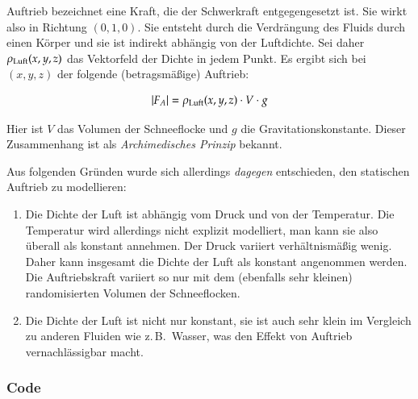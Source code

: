 Auftrieb bezeichnet eine Kraft, die der Schwerkraft entgegengesetzt
ist. Sie wirkt also in Richtung $(0,1,0)$. Sie entsteht durch die
Verdrängung des Fluids durch einen Körper und sie ist indirekt
abhängig von der Luftdichte. Sei daher
$\rho_{\textnormal{Luft}}(x,y,z)$ das Vektorfeld der Dichte in
jedem Punkt. Es ergibt sich bei $(x,y,z)$ der folgende (betragsmäßige)
Auftrieb:

\begin{equation}
|F_A| = \rho_{\textnormal{Luft}}(x,y,z) \cdot V \cdot g
\end{equation}

Hier ist $V$ das Volumen der Schneeflocke und $g$ die
Gravitationskonstante. Dieser Zusammenhang ist als
\emph{Archimedisches Prinzip} bekannt.

Aus folgenden Gründen wurde sich allerdings \emph{dagegen}
entschieden, den statischen Auftrieb zu modellieren:

\begin{enumerate}
\item Die Dichte der Luft ist abhängig vom Druck und von der
Temperatur. Die Temperatur wird allerdings nicht explizit
modelliert, man kann sie also überall als konstant annehmen. Der Druck
variiert verhältnismäßig wenig. Daher kann insgesamt die Dichte der
Luft als konstant angenommen werden. Die Auftriebskraft variiert so
nur mit dem (ebenfalls sehr kleinen) randomisierten Volumen der
Schneeflocken.
\item Die Dichte der Luft ist nicht nur konstant, sie ist auch sehr
klein im Vergleich zu anderen Fluiden wie z.\,B.\ Wasser, was den
Effekt von Auftrieb vernachlässigbar macht.
\end{enumerate}

\subsubsection{Code}

